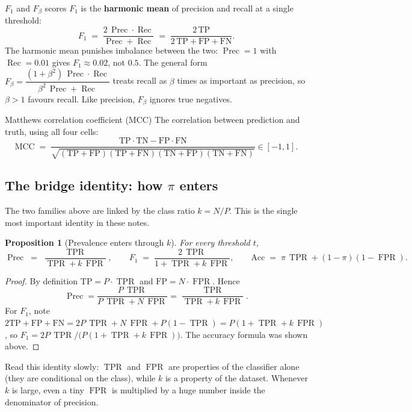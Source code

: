\documentclass[11pt,a4paper]{article}
\DeclareMathOperator{\TPR}{TPR}
\DeclareMathOperator{\FPR}{FPR}
\DeclareMathOperator{\Prec}{Prec}
\DeclareMathOperator{\Rec}{Rec}
\newcommand{\Fone}{F_{1}}
\theoremstyle{plain}
\newtheorem{proposition}[theorem]{Proposition}
\theoremstyle{definition}
\theoremstyle{remark}
\begin{document}
\begin{metric}{$F_1$ and $F_\beta$ scores}
$F_1$ is the \textbf{harmonic mean} of precision and recall at a single threshold:
\[
  \Fone \;=\; \frac{2\,\Prec\cdot\Rec}{\Prec+\Rec} \;=\; \frac{2\,\mathrm{TP}}{2\,\mathrm{TP}+\mathrm{FP}+\mathrm{FN}}.
\]
The harmonic mean punishes imbalance between the two: $\Prec=1$ with $\Rec=0.01$ gives
$\Fone\approx0.02$, not $0.5$. The general form
$F_\beta=\dfrac{(1+\beta^2)\,\Prec\cdot\Rec}{\beta^2\,\Prec+\Rec}$ treats recall as $\beta$ times as
important as precision, so $\beta>1$ favours recall. Like precision, $F_\beta$ ignores true negatives.
\end{metric}

\begin{metric}{Matthews correlation coefficient (MCC)}
The correlation between prediction and truth, using all four cells:
\[
  \mathrm{MCC} \;=\; \frac{\mathrm{TP}\cdot\mathrm{TN}-\mathrm{FP}\cdot\mathrm{FN}}
  {\sqrt{(\mathrm{TP}+\mathrm{FP})(\mathrm{TP}+\mathrm{FN})(\mathrm{TN}+\mathrm{FP})(\mathrm{TN}+\mathrm{FN})}}\in[-1,1].
\]
\end{metric}

\subsection{The bridge identity: how \texorpdfstring{$\pi$}{the prevalence} enters}

The two families above are linked by the class ratio $k=N/P$. This is the single most important
identity in these notes.

\begin{proposition}[Prevalence enters through $k$]\label{prop:bridge}
For every threshold $t$,
\[
  \Prec \;=\; \frac{\TPR}{\TPR + k\,\FPR},
  \qquad
  \Fone \;=\; \frac{2\,\TPR}{1+\TPR+k\,\FPR},
  \qquad
  \mathrm{Acc} \;=\; \pi\,\TPR+(1-\pi)(1-\FPR).
\]
\end{proposition}
\begin{proof}
By definition $\mathrm{TP}=P\cdot\TPR$ and $\mathrm{FP}=N\cdot\FPR$. Hence
\[
  \Prec=\frac{P\,\TPR}{P\,\TPR+N\,\FPR}=\frac{\TPR}{\TPR+k\,\FPR}.
\]
For $F_1$, note $2\mathrm{TP}+\mathrm{FP}+\mathrm{FN} = 2P\,\TPR+N\,\FPR+P(1-\TPR)=P(1+\TPR+k\,\FPR)$,
so $\Fone = 2P\,\TPR/\big(P(1+\TPR+k\,\FPR)\big)$. The accuracy formula was shown above.
\end{proof}

Read this identity slowly: $\TPR$ and $\FPR$ are properties of the classifier alone (they are
conditional on the class), while $k$ is a property of the dataset. Whenever $k$ is large, even a tiny
$\FPR$ is multiplied by a huge number inside the denominator of precision.
\end{document}
